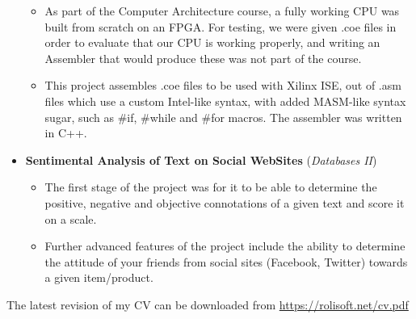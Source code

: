 \documentclass[12pt,a4paper]{article}
\begin{document}
\begin{itemize}
		\begin{itemize}
		\item	As part of the Computer Architecture course, a fully working CPU was built from scratch on an FPGA. For testing, we were given .coe files in order to evaluate that our CPU is working properly, and writing an Assembler that would produce these was not part of the course.
		\item	This project assembles .coe files to be used with Xilinx ISE, out of .asm files which use a custom Intel-like syntax, with added MASM-like syntax sugar, such as \#if, \#while and \#for macros. The assembler was written in C++.
		\end{itemize}
	\item	\textbf{Sentimental Analysis of Text on Social WebSites} (\textit{Databases II})
		\begin{itemize}
		\item	The first stage of the project was for it to be able to determine the positive, negative and objective connotations of a given text and score it on a scale.
		\item	Further advanced features of the project include the ability to determine the attitude of your friends from social sites (Facebook, Twitter) towards a given item/product.
		\end{itemize}
	\end{itemize}
	

	{\color{DarkGray} The latest revision of my CV can be downloaded from}
	\url{https://rolisoft.net/cv.pdf}
\end{document}
